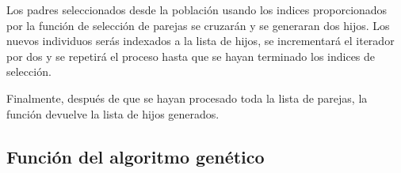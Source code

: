 \documentclass{report}
\begin{document}
    Los padres seleccionados desde la población usando los indices proporcionados por la función de selección de parejas se cruzarán y se generaran dos hijos.
    Los nuevos individuos serás indexados a la lista de hijos, se incrementará el iterador por dos y se repetirá el proceso hasta que se hayan terminado los indices de selección.

    Finalmente, después de que se hayan procesado toda la lista de parejas, la función devuelve la lista de hijos generados.

    \subsection*{Función del algoritmo genético}
    
\end{document}
